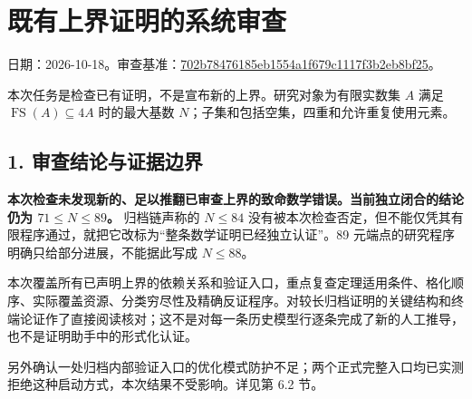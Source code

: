 \documentclass[
  11pt,
  a4paper,
]{article}
\author{}
\date{}
\begin{document}
\hypertarget{ux65e2ux6709ux4e0aux754cux8bc1ux660eux7684ux7cfbux7edfux5ba1ux67e5}{%
\section{既有上界证明的系统审查}\label{ux65e2ux6709ux4e0aux754cux8bc1ux660eux7684ux7cfbux7edfux5ba1ux67e5}}

日期：2026-10-18。审查基准：\href{https://github.com/iH-3/Sum-of-Subset/commit/702b78476185eb1554a1f679c1117f3b2eb8bf25}{702b78476185eb1554a1f679c1117f3b2eb8bf25}。

本次任务是检查已有证明，不是宣布新的上界。研究对象为有限实数集 \(A\)
满足 \(\operatorname{FS}(A)\subseteq4A\) 时的最大基数
\(N\)；子集和包括空集，四重和允许重复使用元素。

\hypertarget{ux5ba1ux67e5ux7ed3ux8bbaux4e0eux8bc1ux636eux8fb9ux754c}{%
\subsection{1.
审查结论与证据边界}\label{ux5ba1ux67e5ux7ed3ux8bbaux4e0eux8bc1ux636eux8fb9ux754c}}

\textbf{本次检查未发现新的、足以推翻已审查上界的致命数学错误。当前独立闭合的结论仍为
\(71\le N\le89\)。} 归档链声称的 \(N\le84\)
没有被本次检查否定，但不能仅凭其有限程序通过，就把它改标为``整条数学证明已经独立认证''。89
元端点的研究程序明确只给部分进展，不能据此写成 \(N\le88\)。

本次覆盖所有已声明上界的依赖关系和验证入口，重点复查定理适用条件、格化顺序、实际覆盖资源、分类穷尽性及精确反证程序。对较长归档证明的关键结构和终端论证作了直接阅读核对；这不是对每一条历史模型行逐条完成了新的人工推导，也不是证明助手中的形式化认证。

另外确认一处归档内部验证入口的优化模式防护不足；两个正式完整入口均已实测拒绝这种启动方式，本次结果不受影响。详见第 6.2 节。
\end{document}
